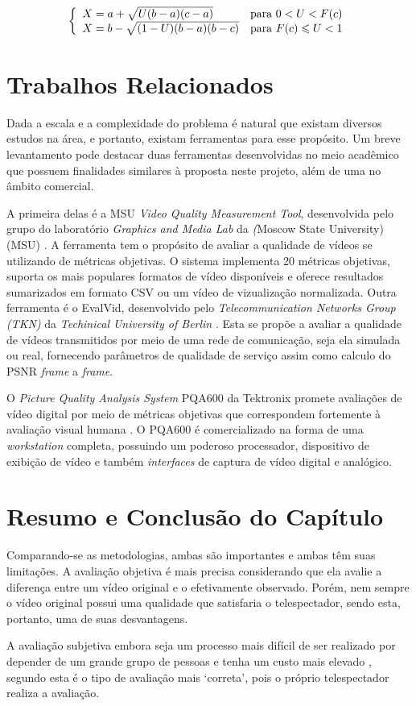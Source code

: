 \[\left\{\begin{array}{l l}
X = a +\sqrt{U(b-a)(c-a)} & \mbox{para } 0 < U < F(c)\\ 
X = b - \sqrt{(1-U)(b-a)(b-c)} & \mbox{para } F(c) \leqslant U < 1
\end{array}\right.\]

\section{Trabalhos Relacionados}

Dada a escala e a complexidade do problema é natural que existam diversos estudos na área, e portanto, existam ferramentas para esse propósito. 
Um breve levantamento pode destacar duas ferramentas desenvolvidas no meio acadêmico que possuem finalidades similares à proposta neste projeto, além de uma no âmbito comercial.

A primeira delas é a MSU \emph{Video Quality Measurement Tool}, desenvolvida pelo grupo do laboratório \emph{Graphics and Media Lab} da \emph(Moscow State University) (MSU) \cite{moscowuniversity}.
A ferramenta tem o propósito de avaliar a qualidade de vídeos se utilizando de métricas objetivas. 
O sistema implementa 20 métricas objetivas, suporta os mais populares formatos de vídeo disponíveis e oferece resultados sumarizados em formato CSV ou um vídeo de vizualização normalizada.
Outra ferramenta é o EvalVid, desenvolvido pelo \emph{Telecommunication Networks Group (TKN)} da \emph{Techinical University of Berlin} \cite{tuberlin}.
Esta se propõe a avaliar a qualidade de vídeos transmitidos por meio de uma rede de comunicação, seja ela simulada ou real, fornecendo parâmetros de qualidade de serviço assim como calculo do PSNR \emph{frame} a \emph{frame}.

O \emph{Picture Quality Analysis System} PQA600 da Tektronix promete avaliações de vídeo digital por meio de métricas objetivas que correspondem fortemente à avaliação visual humana \cite{tektronix}.
O PQA600 é comercializado na forma de uma \emph{workstation} completa, possuindo um poderoso processador, dispositivo de exibição de vídeo e também \emph{interfaces} de captura de vídeo digital e analógico.

\section{Resumo e Conclusão do Capítulo}

Comparando-se as metodologias, ambas são importantes e ambas têm suas limitações. A avaliação objetiva é mais precisa considerando que ela avalie a diferença entre um vídeo original e o efetivamente observado. Porém, nem sempre o vídeo original possui uma qualidade que satisfaria o telespectador, sendo esta, portanto, uma de suas desvantagens.

A avaliação subjetiva embora seja um processo mais difícil de ser realizado por depender de um grande grupo de pessoas e tenha um custo mais elevado \cite{albini}, segundo \cite{wangbovik2004} esta é o tipo de avaliação mais ‘correta’, pois o próprio telespectador realiza a avaliação.
